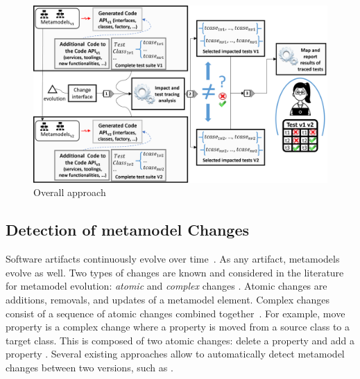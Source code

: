 \begin{figure}[tb]
\centering
\includegraphics[width=1\textwidth]{./pics/chapter2pics/OverallApproachV2.png}
\caption{Overall approach}
\label{fig:appraoch}
\end{figure}


\subsection{Detection of metamodel Changes}\label{sec:changes}

Software artifacts continuously evolve over time~\cite{mens2008introduction}.
As any artifact, metamodels evolve as well. 
Two types of changes are known and considered in the literature for metamodel evolution: \emph{atomic} and \emph{complex} changes \cite{Herrmannsdoerfer2011}. 
Atomic changes are additions, removals, and updates of a metamodel element. Complex changes consist of a sequence of atomic changes combined together~\cite{vermolen_reconstructing_2012,khelladi2015detecting}. For example, move property is a complex change where a property is moved from a source class to a target class. This is composed of two atomic changes: delete a property and add a property \cite{Herrmannsdoerfer2011}. 
Several existing approaches allow to automatically detect metamodel changes between two versions, such as \cite{Alter2015, williams2012searching,cicchetti_managing_2009,langer_posteriori_2013,vermolen_reconstructing_2012,Khelladi2016}.

